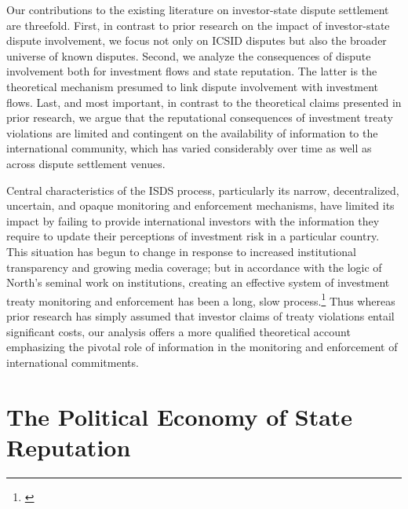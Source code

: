 \documentclass[12pt,onesided]{amsart}
\begin{document}
Our contributions to the existing literature on investor-state dispute settlement are threefold. First, in contrast to prior research on the impact of investor-state dispute involvement, we focus not only on ICSID disputes but also the broader universe of known disputes. Second, we analyze the consequences of dispute involvement both for investment flows and state reputation. The latter is the theoretical mechanism presumed to link dispute involvement with investment flows. Last, and most important, in contrast to the theoretical claims presented in prior research, we argue that the reputational consequences of investment treaty violations are limited and contingent on the availability of information to the international community, which has varied considerably over time as well as across dispute settlement venues.

Central characteristics of the ISDS process, particularly its narrow, decentralized, uncertain, and opaque monitoring and enforcement mechanisms, have limited its impact by failing to provide international investors with the information they require to update their perceptions of investment risk in a particular country. This situation has begun to change in response to increased institutional transparency and growing media coverage; but in accordance with the logic of North's seminal work on institutions, creating an effective system of investment treaty monitoring and enforcement has been a long, slow process.\footnote{\citet[60]{north1990institutions}} Thus whereas prior research has simply assumed that investor claims of treaty violations entail significant costs, our analysis offers a more qualified theoretical account emphasizing the pivotal role of information in the monitoring and enforcement of international commitments.

\section*{The Political Economy of State Reputation}
\end{document}
